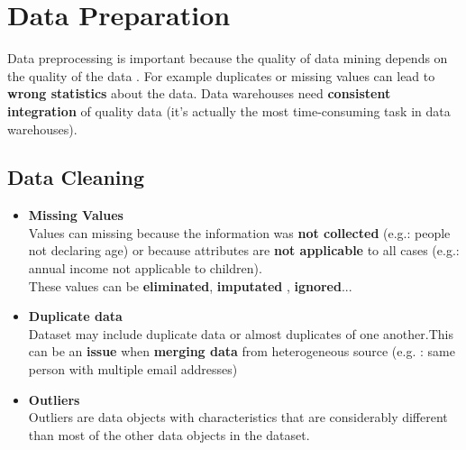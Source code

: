 \newpage
\section{Data Preparation}
Data preprocessing is important because the quality of data mining depends on the quality of the data . For example duplicates or missing values can lead to \textbf{wrong statistics} about the data. Data warehouses need \textbf{consistent integration} of quality data (it's actually the most time-consuming task in data warehouses).

\subsection{Data Cleaning}
\begin{itemize}
\item \textbf{Missing Values}\\
Values can missing because the information was \textbf{not collected} (e.g.: people not declaring age) or because attributes are  \textbf{not applicable} to all cases 
(e.g.: annual income not applicable to children).\\
These values can be \textbf{eliminated}, \textbf{imputated} , \textbf{ignored}...
\item \textbf{Duplicate data}\\
Dataset may include duplicate data or almost duplicates of one another.This can be an \textbf{issue} when \textbf{merging data} from heterogeneous source (e.g. : same person with multiple email addresses)
\item \textbf{Outliers}\\
Outliers are data objects with characteristics that are considerably different than most of the other data objects in the dataset.
\end{itemize}

